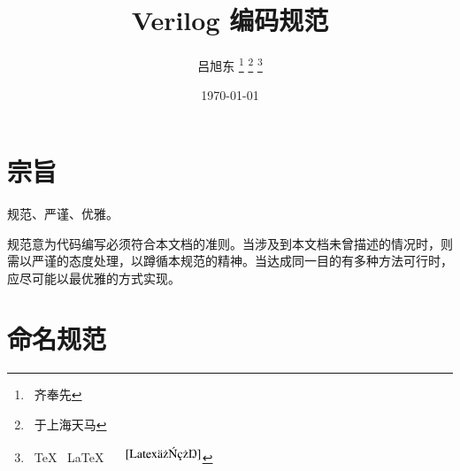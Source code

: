 \documentclass[utf-8, 10pt, a4paper, titlepage, oneside, onecolumn, openany]{ctexart} %
\begin{document}
	\renewcommand{\thefootnote}{\fnsymbol{footnote}} %


	\title{\textbf{Verilog 编码规范}} %
	\author{吕旭东 \thanks{~齐奉先} \footnote{~于上海天马} \footnote{~\TeX ~ \LaTeX ~ \LaTeXe ~ \XeLaTeX $^{\cite{Latex介绍}}$}} %
	\date{\today} %
	\maketitle %

	\tableofcontents {}	%
	\clearpage %

	\renewcommand{\thefootnote}{\arabic{footnote}} %


	\section{宗旨}
		规范、严谨、优雅。
		
		规范意为代码编写必须符合本文档的准则。当涉及到本文档未曾描述的情况时，则需以严谨的态度处理，以蹲循本规范的精神。当达成同一目的有多种方法可行时，应尽可能以最优雅的方式实现。
		
	\section{命名规范}
\end{document}
